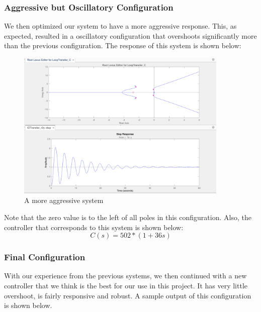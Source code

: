 \subsubsection{Aggressive but Oscillatory Configuration}
We then optimized our system to have a more aggressive response. This, as expected, resulted in a oscillatory configuration that overshoots significantly more than the previous configuration. The response of this system is shown below:
\begin{figure}[H]
    \centering
    \includegraphics[width=0.9\textwidth]{images/oscillatory.png}
    \caption{A more aggressive system}
    \label{fig:agg}
\end{figure}

Note that the zero value is to the left of all poles in this configuration. Also, the controller that corresponds to this system is shown below:
\begin{equation}
        C(s) = 502 * (1 + 36s)
\end{equation}

\subsubsection{Final Configuration}
With our experience from the previous systems, we then continued with a new controller that we think is the best for our use in this project. It has very little overshoot, is fairly responsive and robust. A sample output of this configuration is shown below.


